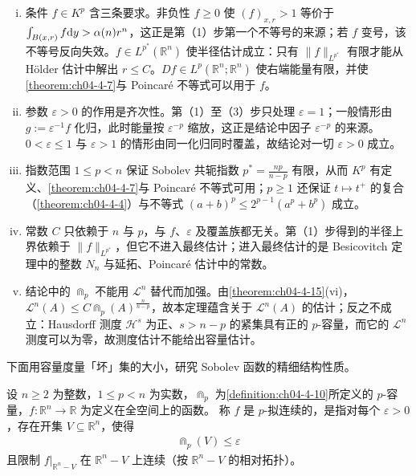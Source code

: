 \documentclass[../../main.tex]{subfiles}%
\begin{document}
\begin{remark}\label{remark:ch04-thm-4-18-条件}
\begin{enumerate}[(i)]
\item 条件 $f\in K^p$ 含三条要求。非负性 $f\geqslant0$ 使 $(f)_{x,r}>1$ 等价于 $\int_{B(x,r)}f\mathrm{d} y>\alpha(n)r^n$，这正是第（1）步第一个不等号的来源；若 $f$ 变号，该不等号反向失效。$f\in L^{p^*}(\mathbb{R}^n)$ 使半径估计成立：只有 $\lVert f\rVert_{L^{p^*}}$ 有限才能从 Hölder 估计中解出 $r\leqslant C$。$Df\in L^p(\mathbb{R}^n;\mathbb{R}^n)$ 使右端能量有限，并使\cref{theorem:ch04-4-7}与 Poincaré 不等式可以用于 $f$。%
\item 参数 $\varepsilon>0$ 的作用是齐次性。第（1）至（3）步只处理 $\varepsilon=1$；一般情形由 $g:=\varepsilon^{-1}f$ 化归，此时能量按 $\varepsilon^{-p}$ 缩放，这正是结论中因子 $\varepsilon^{-p}$ 的来源。$0<\varepsilon\leqslant1$ 与 $\varepsilon>1$ 的情形由同一化归同时覆盖，故结论对一切 $\varepsilon>0$ 成立。
\item 指数范围 $1\leqslant p<n$ 保证 Sobolev 共轭指数 $p^*=\frac{np}{n-p}$ 有限，从而 $K^p$ 有定义、\cref{theorem:ch04-4-7}与 Poincaré 不等式可用；$p\geqslant1$ 还保证 $t\mapsto t^+$ 的复合（\cref{theorem:ch04-4-4}）与不等式 $(a+b)^p\leqslant2^{p-1}(a^p+b^p)$ 成立。%
\item 常数 $C$ 只依赖于 $n$ 与 $p$，与 $f$、$\varepsilon$ 及覆盖族都无关。第（1）步得到的半径上界依赖于 $\lVert f\rVert_{L^{p^*}}$，但它不进入最终估计；进入最终估计的是 Besicovitch 定理中的整数 $N_n$ 与延拓、Poincaré 估计中的常数。
\item 结论中的 $\Cap_p$ 不能用 $\mathcal{L}^n$ 替代而加强。由\cref{theorem:ch04-4-15}(vi)，$\mathcal{L}^n(A)\leqslant C\Cap_p(A)^{\frac{n}{n-p}}$，故本定理蕴含关于 $\mathcal{L}^n(A)$ 的估计；反之不成立：Hausdorff 测度 $\mathcal{H}^s$ 为正、$s>n-p$ 的紧集具有正的 $p$-容量，而它的 $\mathcal{L}^n$ 测度可以为零，故测度估计不能给出容量估计。%
\end{enumerate}
\end{remark}

下面用容量度量「坏」集的大小，研究 Sobolev 函数的精细结构性质。

\begin{definition}[$p$-拟连续]\label{definition:ch04-4-11}
设 $n\geqslant2$ 为整数，$1\leqslant p<n$ 为实数，$\Cap_p$ 为\cref{definition:ch04-4-10}所定义的 $p$-容量，$f:\mathbb{R}^n\to\mathbb{R}$ 为定义在全空间上的函数。%
称 $f$ 是 $p$-拟连续的，是指对每个 $\varepsilon>0$，存在开集 $V\subseteq\mathbb{R}^n$，使得
\begin{align*}
\Cap_p(V)\leqslant\varepsilon
\end{align*}
且限制 $f|_{\mathbb{R}^n-V}$ 在 $\mathbb{R}^n-V$ 上连续（按 $\mathbb{R}^n-V$ 的相对拓扑）。
\end{definition}
\end{document}

